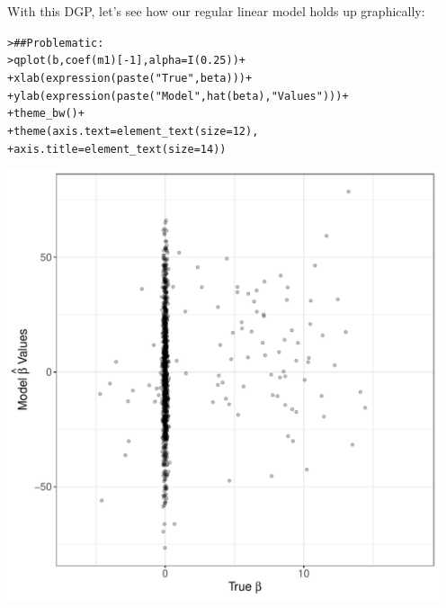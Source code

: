 \documentclass[12pt]{article}\usepackage[]{graphicx}\usepackage[]{color}
\makeatletter
\newcommand{\hlnum}[1]{\textcolor[rgb]{0.82,0.78,0.62}{#1}}%
\newcommand{\hlstr}[1]{\textcolor[rgb]{0.82,0.78,0.62}{#1}}%
\newcommand{\hlcom}[1]{\textcolor[rgb]{0.404,0.408,0.42}{#1}}%
\newcommand{\hlopt}[1]{\textcolor[rgb]{0.882,0.878,0.898}{#1}}%
\newcommand{\hlstd}[1]{\textcolor[rgb]{0.882,0.878,0.898}{#1}}%
\newcommand{\hlkwc}[1]{\textcolor[rgb]{0.812,0.522,0.388}{#1}}%
\newcommand{\hlkwd}[1]{\textcolor[rgb]{0.733,0.388,0.812}{#1}}%
\newenvironment{kframe}{%
 \def\at@end@of@kframe{}%
 \ifinner\ifhmode%
  \def\at@end@of@kframe{\end{minipage}}%
  \begin{minipage}{\columnwidth}%
 \fi\fi%
 \def\FrameCommand##1{\hskip\@totalleftmargin \hskip-\fboxsep
 \colorbox{shadecolor}{##1}\hskip-\fboxsep
     \hskip-\linewidth \hskip-\@totalleftmargin \hskip\columnwidth}%
 \MakeFramed {\advance\hsize-\width
   \@totalleftmargin\z@ \linewidth\hsize
   \@setminipage}}%
 {\par\unskip\endMakeFramed%
 \at@end@of@kframe}
\newenvironment{knitrout}{}{} %
\makeatother
\begin{document}
\begin{flushleft}
With this DGP, let's see how our regular linear model holds up graphically:

\begin{knitrout}
\color{fgcolor}\begin{kframe}
\begin{alltt}
\hlstd{> }\hlcom{## Problematic:}
\hlstd{> }\hlkwd{qplot}\hlstd{(b,} \hlkwd{coef}\hlstd{(m1)[}\hlopt{-}\hlnum{1}\hlstd{],} \hlkwc{alpha}\hlstd{=}\hlkwd{I}\hlstd{(}\hlnum{0.25}\hlstd{))}\hlopt{+}
\hlstd{+ }     \hlkwd{xlab}\hlstd{(} \hlkwd{expression}\hlstd{(}\hlkwd{paste}\hlstd{(}\hlstr{"True "} \hlstd{, beta)))}\hlopt{+}
\hlstd{+ }     \hlkwd{ylab}\hlstd{(} \hlkwd{expression}\hlstd{(}\hlkwd{paste}\hlstd{(}\hlstr{"Model "} \hlstd{,} \hlkwd{hat}\hlstd{(beta),} \hlstr{" Values"}\hlstd{)))}\hlopt{+}
\hlstd{+ }     \hlkwd{theme_bw}\hlstd{()}\hlopt{+}
\hlstd{+ }     \hlkwd{theme}\hlstd{(}\hlkwc{axis.text} \hlstd{=} \hlkwd{element_text}\hlstd{(}\hlkwc{size}\hlstd{=}\hlnum{12}\hlstd{),}
\hlstd{+ }          \hlkwc{axis.title} \hlstd{=} \hlkwd{element_text}\hlstd{(}\hlkwc{size}\hlstd{=}\hlnum{14}\hlstd{))}
\end{alltt}


{\ttfamily\noindent\color{warningcolor}{\#\# Warning: Removed 501 rows containing missing values (geom\_point).}}\end{kframe}
\includegraphics[width=5in]{figure/lmoutputML2-1} 


\end{knitrout}
\end{flushleft}
\end{document}
